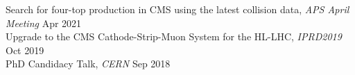 Search for four-top production in CMS using the latest collision data, \textit{APS April Meeting} \hfill Apr 2021 \\
Upgrade to the CMS Cathode-Strip-Muon System for the HL-LHC, \textit{IPRD2019} \hfill Oct 2019 \\
PhD Candidacy Talk, \textit{CERN} \hfill Sep 2018 \\

